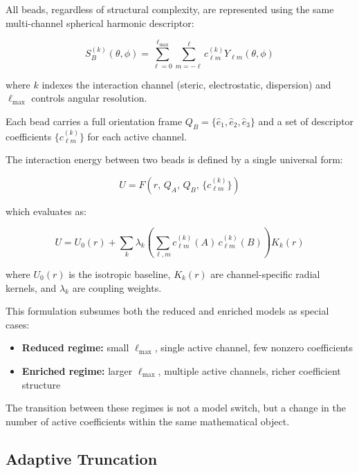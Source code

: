\documentclass[11pt]{article}
\begin{document}
All beads, regardless of structural complexity, are represented using the same multi-channel spherical harmonic descriptor:

\begin{equation}
S_B^{(k)}(\theta,\phi) = \sum_{\ell=0}^{\ell_{\max}} \sum_{m=-\ell}^{\ell} c_{\ell m}^{(k)} Y_{\ell m}(\theta,\phi)
\end{equation}

where $k$ indexes the interaction channel (steric, electrostatic, dispersion) and $\ell_{\max}$ controls angular resolution.

Each bead carries a full orientation frame $Q_B = \{\hat{e}_1, \hat{e}_2, \hat{e}_3\}$ and a set of descriptor coefficients $\{c_{\ell m}^{(k)}\}$ for each active channel.

The interaction energy between two beads is defined by a single universal form:

\begin{equation}
U = F\!\left(r,\, Q_A,\, Q_B,\, \{c_{\ell m}^{(k)}\}\right)
\end{equation}

which evaluates as:

\begin{equation}
U = U_0(r) + \sum_k \lambda_k \left(\sum_{\ell,m} c_{\ell m}^{(k)}(A)\, c_{\ell m}^{(k)}(B)\right) K_k(r)
\end{equation}

where $U_0(r)$ is the isotropic baseline, $K_k(r)$ are channel-specific radial kernels, and $\lambda_k$ are coupling weights.

This formulation subsumes both the reduced and enriched models as special cases:

\begin{itemize}
    \item \textbf{Reduced regime:} small $\ell_{\max}$, single active channel, few nonzero coefficients
    \item \textbf{Enriched regime:} larger $\ell_{\max}$, multiple active channels, richer coefficient structure
\end{itemize}

The transition between these regimes is not a model switch, but a change in the number of active coefficients within the same mathematical object.

\subsection{Adaptive Truncation}
\end{document}
